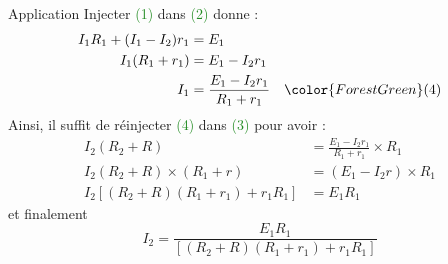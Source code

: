 \documentclass[../main/main.tex]{subfiles}
\begin{document}
\begin{center}
    \begin{NCexem}[width=.7\linewidth]{Application}
        Injecter \textcolor{ForestGreen}{(1)} dans \textcolor{ForestGreen}{(2)}
        donne :
        \begin{align*}
            I_1R_1 + (I_1-I_2)r_1 &= E_1\\
            I_1(R_1+r_1) &= E_1-I_2r_1\\
            I_1 &= \frac{E_1 - I_2r_1}{R_1 + r_1} \quad \color{ForestGreen}(4)
        \end{align*}
        Ainsi, il suffit de réinjecter \textcolor{ForestGreen}{(4)} dans
        \textcolor{ForestGreen}{(3)} pour avoir :
        \begin{align*}
            I_2(R_2+R) &= \frac{E_1 - I_2r_1}{R_1 + r_1}\times R_1\\
            I_2(R_2+R)\times(R_1+r) &= (E_1-I_2r)\times R_1\\
            I_2 \left[ (R_2+R)(R_1+r_1)+r_1R_1 \right] &= E_1R_1
        \end{align*}
        et finalement
        \[\boxed{I_2 = \frac{E_1R_1}{\left[ (R_2+R)(R_1+r_1)+r_1R_1 \right]}}\]
    \end{NCexem}
\end{center}
\vfill
\end{document}
